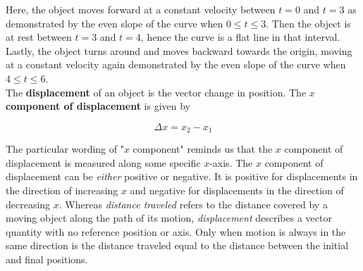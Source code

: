         \begin{center}
        \end{center}

        \noindent Here, the object moves forward at a constant velocity between $t=0$ and $t=3$ as demonstrated by the even slope of the curve when $0\leq t\leq 3$. Then the object is at rest between $t=3$ and $t=4$,
        hence the curve is a flat line in that interval. Lastly, the object turns around and moves backward towards the origin, moving at a constant velocity again demonstrated by the even slope of the curve when
        $4\leq t \leq 6$. \\

        \noindent The \textbf{displacement} of an object is the vector change in position. The \textbf{$x$ component of displacement} is given by

        \[
            \Delta x = x_2 - x_1
        \]

        \noindent The particular wording of "$x$ component" reminds us that the $x$ component of displacement is measured along some specific $x$-axis. The $x$ component of displacement can be \textit{either} positive or
        negative. It is positive for displacements in the direction of increasing $x$ and negative for displacements in the direction of decreasing $x$. Whereas \textit{distance traveled} refers to the distance covered
        by a moving object along the path of its motion, \textit{displacement} describes a vector quantity with no reference position or axis. Only when motion is always in the same direction is the distance traveled
        equal to the distance between the initial and final positions.




